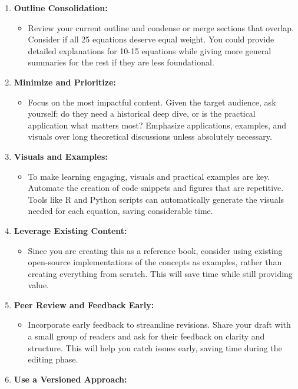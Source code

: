 \documentclass[
  12 pt,
  a4paper,
]{book}
\providecommand{\tightlist}{%
  \setlength{\itemsep}{0pt}\setlength{\parskip}{0pt}}
\numberwithin{equation}{section}
\theoremstyle{plain}      %
\theoremstyle{definition} %
\theoremstyle{remark}     %
\theoremstyle{note}         %
\begin{document}
\begin{enumerate}
\def\labelenumi{\arabic{enumi}.}
\tightlist
\item
  \textbf{Outline Consolidation:}

  \begin{itemize}
  \tightlist
  \item
    Review your current outline and condense or merge sections that
    overlap. Consider if all 25 equations deserve equal weight. You
    could provide detailed explanations for 10-15 equations while giving
    more general summaries for the rest if they are less foundational.
  \end{itemize}
\item
  \textbf{Minimize and Prioritize:}

  \begin{itemize}
  \tightlist
  \item
    Focus on the most impactful content. Given the target audience, ask
    yourself: do they need a historical deep dive, or is the practical
    application what matters most? Emphasize applications, examples, and
    visuals over long theoretical discussions unless absolutely
    necessary.
  \end{itemize}
\item
  \textbf{Visuals and Examples:}

  \begin{itemize}
  \tightlist
  \item
    To make learning engaging, visuals and practical examples are key.
    Automate the creation of code snippets and figures that are
    repetitive. Tools like R and Python scripts can automatically
    generate the visuals needed for each equation, saving considerable
    time.
  \end{itemize}
\item
  \textbf{Leverage Existing Content:}

  \begin{itemize}
  \tightlist
  \item
    Since you are creating this as a reference book, consider using
    existing open-source implementations of the concepts as examples,
    rather than creating everything from scratch. This will save time
    while still providing value.
  \end{itemize}
\item
  \textbf{Peer Review and Feedback Early:}

  \begin{itemize}
  \tightlist
  \item
    Incorporate early feedback to streamline revisions. Share your draft
    with a small group of readers and ask for their feedback on clarity
    and structure. This will help you catch issues early, saving time
    during the editing phase.
  \end{itemize}
\item
  \textbf{Use a Versioned Approach:}


\end{enumerate}
\end{document}
